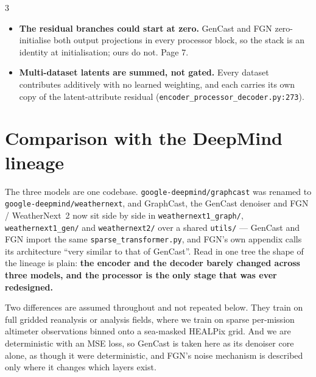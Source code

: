 \documentclass[11pt,landscape]{article}
\begin{document}
\begin{multicols}{3}
\begin{itemize}[leftmargin=1.1em]
    \item \textbf{The residual branches could start at zero.}
      GenCast and FGN zero-initialise both output projections in every processor
      block, so the stack is an identity at initialisation; ours do not.  Page 7.

    \item \textbf{Multi-dataset latents are summed, not gated.}
      Every dataset contributes additively with no learned weighting, and each
      carries its own copy of the latent-attribute residual
      (\texttt{encoder\_\-processor\_\-decoder.py:273}).

\end{itemize}
\end{multicols}

\clearpage

\section*{Comparison with the DeepMind lineage}

{\small\sloppy
The three models are one codebase.  {\tt google-deepmind/graphcast} was renamed to
{\tt google-deepmind/weathernext}, and GraphCast, the GenCast denoiser and
FGN / WeatherNext~2 now sit side by side in {\tt weathernext1\_graph/},
{\tt weathernext1\_gen/} and {\tt weathernext2/} over a shared {\tt utils/} ---
GenCast and FGN import the same {\tt sparse\_transformer.py}, and FGN's own
appendix calls its architecture ``very similar to that of GenCast''.  Read in one
tree the shape of the lineage is plain: \textbf{the encoder and the decoder barely
changed across three models, and the processor is the only stage that was ever
redesigned.}
\par}

{\footnotesize\smallskip
Two differences are assumed throughout and not repeated below.  They train on full
gridded reanalysis or analysis fields, where we train on sparse per-mission
altimeter observations binned onto a sea-masked HEALPix grid.  And we are
deterministic with an MSE loss, so GenCast is taken here as its denoiser core
alone, as though it were deterministic, and FGN's noise mechanism is described
only where it changes which layers exist.
\par}
\end{document}
